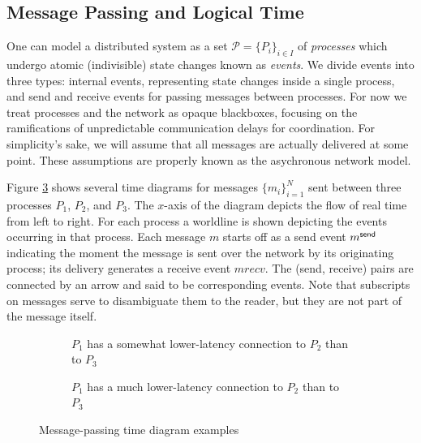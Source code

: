 \documentclass[]             %
{NASA}                       %
\theoremstyle{definition}
\begin{document}
\subsection{Message Passing and Logical Time}
\label{ssec:message-passing}
One can model a distributed system as a set
\(\mathcal{P} = \{P_i\}_{i\in I}\) of \emph{processes} which undergo
atomic (indivisible) state changes known as \emph{events}. We divide
events into three types: internal events, representing state changes
inside a single process, and send and receive events for passing
messages between processes. For now we treat processes and the network
as opaque blackboxes, focusing on the ramifications of unpredictable
communication delays for coordination.  For simplicity's sake, we will
assume that all messages are actually delivered at some point. These
assumptions are properly known as the asychronous network model.

Figure \ref{fig:message-latencies} shows several time diagrams for
messages $\{m_i\}_{i=1}^N$ sent between three processes $P_1$, $P_2$,
and $P_3$. The $x$-axis of the diagram depicts the flow of real time
from left to right. For each process a worldline is shown depicting
the events occurring in that process. Each message $m$ starts off as a
send event $m_{}^{\mathsf{send}}$ indicating the moment the message is sent
over the network by its originating process; its delivery generates a
receive event $mrecv{}$. The (send, receive) pairs are
connected by an arrow and said to be corresponding events. Note that
subscripts on messages serve to disambiguate them to the reader, but
they are not part of the message itself.

\begin{figure}[p]
  \setlength\belowcaptionskip{5ex}
  \begin{subfigure}{1\textwidth}
    \centering
    
    \caption{$P_1$ has a somewhat lower-latency connection to $P_2$ than to $P_3$}
    \label{fig:message-latencies-a}
  \end{subfigure}
  \begin{subfigure}{1\textwidth}
    \centering 
    \caption{$P_1$ has a much lower-latency connection to $P_2$ than to $P_3$}
    \label{fig:message-latencies-b}
  \end{subfigure}
  \caption{Message-passing time diagram examples}
  \label{fig:message-latencies}
\end{figure}

\afterpage{\clearpage}
\end{document}
